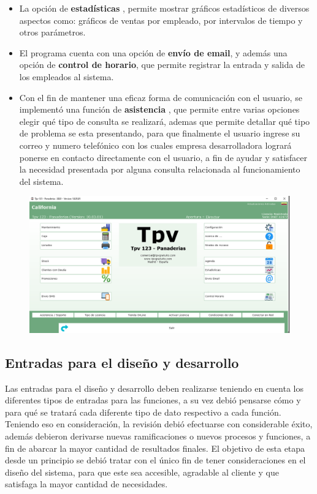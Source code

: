 \documentclass[12pt]{article}
\begin{document}
\begin{itemize}
	\item La opción de \textbf{estadísticas} , permite mostrar gráficos estadísticos de diversos aspectos como:  gráficos de ventas por empleado, por intervalos de tiempo y otros parámetros.
	\item El programa cuenta con una opción de \textbf{envío de email}, y además una opción de \textbf{control de horario}, que permite registrar la entrada y salida de los empleados al sistema.
	\item Con el fin de mantener una eficaz forma de comunicación con el usuario, se implementó una función de \textbf{asistencia} , que permite entre varias opciones elegir qué tipo de consulta se realizará, ademas que permite detallar qué tipo de problema se esta presentando, para que finalmente el usuario ingrese su correo y numero telefónico con los cuales empresa desarrolladora logrará ponerse en contacto directamente con el usuario, a fin de ayudar y satisfacer la necesidad presentada por alguna consulta relacionada al funcionamiento del sistema.
\end{itemize}

\begin{figure}[h]
\includegraphics[scale=0.4]{interfaz.png}
\centering
\end{figure}


\subsection{Entradas para el diseño y desarrollo}
Las entradas para el diseño y desarrollo deben realizarse teniendo en cuenta los diferentes tipos de entradas para las funciones, a su vez debió pensarse cómo y para qué se tratará cada diferente tipo de dato respectivo a cada función. Teniendo eso en consideración, la revisión debió efectuarse con considerable éxito, además debieron derivarse nuevas ramificaciones o nuevos procesos y funciones, a fin de abarcar la mayor cantidad de resultados finales. El objetivo de esta etapa desde un principio se debió tratar con el único fin de tener consideraciones en el diseño del sistema, para que este sea accesible, agradable al cliente y que satisfaga la mayor cantidad de necesidades. 
\end{document}
